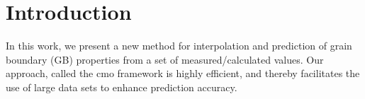 \documentclass[preprint,12pt]{elsarticle}
\begin{document}

\maketitle

\section{Introduction} \label{sec:intro}

In this work, we present a new method for interpolation and prediction of grain boundary (GB) properties from a set of measured/calculated values. Our approach, called the \gls{cmo} framework is highly efficient, and thereby facilitates the use of large data sets to enhance prediction accuracy.
\end{document}
